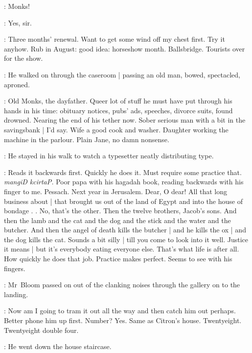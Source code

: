 \foreman:
Monks!%

\monks:
Yes, sir.

\BloomInt:
Three months' renewal.
Want to get some wind off my chest first.
Try it anyhow.
Rub in August:
good idea: horseshow month.
Ballsbridge.
Tourists over for the show.



:
He walked on through the caseroom |
passing an old man, bowed, spectacled, aproned.

\BloomInt:
Old Monks, the dayfather.
Queer lot of stuff he must have put through his hands in his time:
obituary notices, pubs' ads, speeches, divorce suits, found drowned.
Nearing the end of his tether now.
Sober serious man with a bit in the savingsbank |
I'd say.
Wife a good cook and washer.
Daughter working the machine in the parlour.
Plain Jane, no damn nonsense.



:
He stayed in his walk to watch a typesetter
neatly distributing type.

\BloomInt:
Reads it backwards first.
Quickly he does it.
Must require some practice that.
\emph{mangiD kcirtaP.}
Poor papa with his hagadah book,
reading backwards with his finger to me.
Pessach.
Next year in Jerusalem.
Dear, O dear!
All that long business about |
that brought us out of the land of Egypt
and into the house of bondage .
.
No, that's the other.
Then the twelve brothers, Jacob's sons.
And then the lamb and the cat and the dog
and the stick and the water and the butcher.
And then the angel of death kills the butcher |
and he kills the ox |
and the dog kills the cat.
Sounds a bit silly |
till you come to look into it well.
Justice it means |
but it's everybody eating everyone else.
That's what life is after all.
How quickly he does that job.
Practice makes perfect.
Seems to see with his fingers.

:
Mr~Bloom passed on out of the clanking noises
through the gallery on to the landing.

\BloomInt:
Now am I going to tram it out all the way and then catch him out perhaps.
Better phone him up first.
Number?
Yes.
Same as Citron's house.
Twentyeight.
Twentyeight double four.



:
He went down the house staircase.

